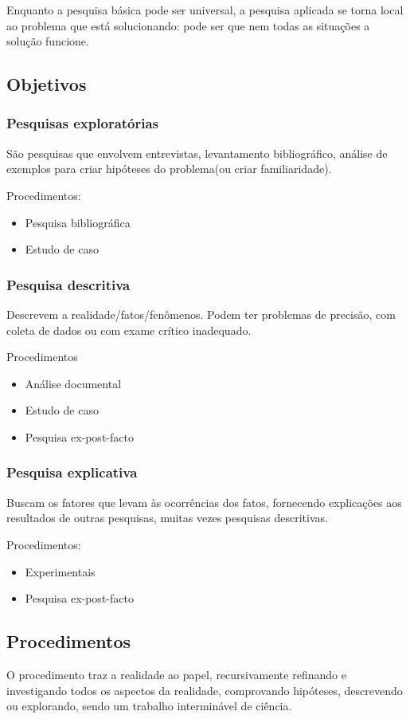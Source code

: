 Enquanto a pesquisa básica pode ser universal, a pesquisa aplicada se torna local ao problema que está solucionando: pode ser que nem todas as situações a solução funcione.


\subsection{Objetivos}
\subsubsection{Pesquisas exploratórias}
São pesquisas que envolvem entrevistas, levantamento bibliográfico, análise de exemplos para criar hipóteses do problema(ou criar familiaridade).

Procedimentos:
\begin{itemize}
    \item Pesquisa bibliográfica
    \item Estudo de caso
\end{itemize}

\subsubsection{Pesquisa descritiva}
Descrevem a realidade/fatos/fenômenos. Podem ter problemas de precisão, com coleta de dados ou com exame crítico inadequado.

Procedimentos
\begin{itemize}
    \item Análise documental
    \item Estudo de caso
    \item Pesquisa ex-post-facto
\end{itemize}

\subsubsection{Pesquisa explicativa}
Buscam os fatores que levam às ocorrências dos fatos, fornecendo explicações aos resultados de outras pesquisas, muitas vezes pesquisas descritivas.

Procedimentos:
\begin{itemize}
    \item Experimentais
    \item Pesquisa ex-post-facto
\end{itemize}


\subsection{Procedimentos}
O procedimento traz a realidade ao papel, recursivamente refinando e investigando todos os aspectos da realidade, comprovando hipóteses, descrevendo ou explorando, sendo um trabalho interminável de ciência.

